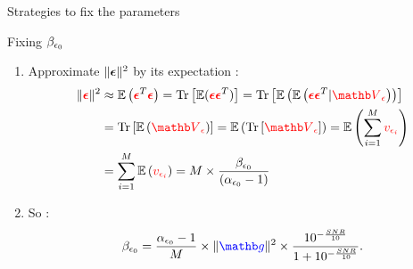 \documentclass[latex]{beamer}
\def\beq{\[} \def\eeq{\]}
\begin{document}
\begin{frame}{Strategies to fix the parameters}
\begin{block}{Fixing $\beta_{\epsilon_0}$}
\begin{enumerate}
\item Approximate $\|{\boldsymbol{\epsilon}}\|^{2}$ by its expectation :
\begin{align*}
\|\red{\epsilonb}\|^{2} &\approx \mathbb{E}\left(\red{\epsilonb}^{T}\red{\epsilonb}\right)
=\Tr{\mathbb{E}(\red{\epsilonb}\red{\epsilonb}^{T})}=\Tr{\mathbb{E}\left(\mathbb{E}\left(\red{\epsilonb}\red{\epsilonb}^{T}|\red{\Vb_{\epsilon}}\right)\right)} \\
&=\Tr{\mathbb{E}\left(\red{\Vb_{\epsilon}}\right)}=\mathbb{E}\left(\Tr{\red{\Vb_{\epsilon}}}\right)=\mathbb{E}\left(\sum_{i=1}^{M} \red{v_{\epsilon_{i}}}\right) \\
&=\sum_{i=1}^{M}\mathbb{E}\left(\red{v_{\epsilon_{i}}}\right)=M \times \frac{\betaez}{\left(\alphaez-1\right)}
\end{align*}
\item So :
\beq
\betaez=\frac{\alphaez-1}{M}\times\|\bgb\|^{2}\times \frac{10^{-\frac{SNR}{10}}}{1+10^{-\frac{SNR}{10}}}.
\label{eq:betaez appendix}
\eeq
\end{enumerate}
\end{block}
\end{frame}
\end{document}
